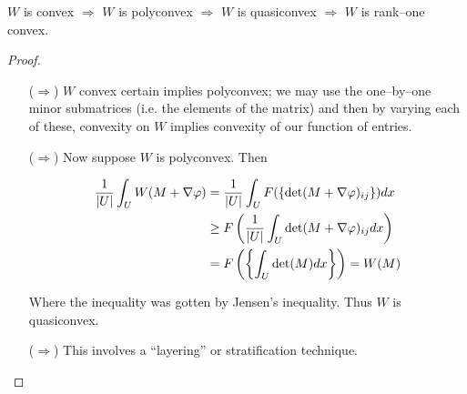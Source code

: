 \documentclass[../main.tex]{subfiles}
\begin{document}
\begin{thm}
  $W$ is convex $\Rightarrow$ $W$ is polyconvex $\Rightarrow$ $W$ is quasiconvex $\Rightarrow$ $W$ is rank--one convex.
\end{thm}

\begin{proof}

  
\begin{itemize}
\item[($\Rightarrow$)]   $W$ convex certain implies polyconvex; we may use the one--by--one minor submatrices (i.e. the elements of the matrix) and then by varying each of these, convexity on $W$ implies convexity of our function of entries. 
\item[($\Rightarrow$)] Now suppose $W$ is polyconvex.
  Then

  \begin{align*}
    \frac{1}{\lvert U\rvert} \int_U W(M + \nabla \varphi) &= \frac{1}{\lvert U\rvert} \int_U F( \{\mathrm{det}( M + \nabla \varphi)_{ij}\} ) dx \\
                                     &\geq F\left( \frac{1}{\lvert U\rvert} \int_U \mathrm{det} (M + \nabla \varphi)_{ij} dx \right) \\
                                     &= F \left( \left\{ \int_U \mathrm{det} (M) dx \right\} \right) = W(M)
  \end{align*}

  Where the inequality was gotten by Jensen's inequality.
  Thus $W$ is quasiconvex.

  
\item[($\Rightarrow$)] This involves a ``layering'' or stratification technique.

\end{itemize}


  
\end{proof}


\printbibliography
\end{document}
